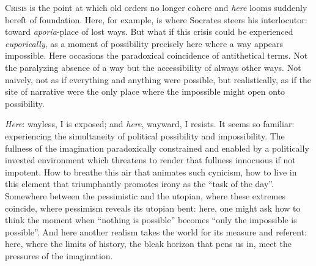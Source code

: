 \documentclass[
]{memoir}
\begin{document}
\textsc{Crisis} is the point at which old orders no longer cohere and
\emph{here} looms suddenly bereft of foundation. Here, for example, is
where Socrates steers his interlocutor: toward \emph{aporia}-place of
lost ways. But what if this crisis could be experienced
\emph{euporically}, as a moment of possibility precisely here where a
way appears impossible. Here occasions the paradoxical coincidence of
antithetical terms. Not the paralyzing absence of a way but the
accessibility of always other ways. Not naively, not as if everything
and anything were possible, but realistically, as if the site of
narrative were the only place where the impossible might open onto
possibility.

\emph{Here}: wayless, I is exposed; and \emph{here}, wayward, I resists.
It seems so familiar: experiencing the simultaneity of political
possibility and impossibility. The fullness of the imagination
paradoxically constrained and enabled by a politically invested
environment which threatens to render that fullness innocuous if not
impotent. How to breathe this air that animates such cynicism, how to
live in this element that triumphantly promotes irony as the ``task of
the day''. Somewhere between the pessimistic and the utopian, where
these extremes coincide, where pessimism reveals its utopian bent: here,
one might ask how to think the moment when ``nothing is possible''
becomes ``only the impossible is possible''. And here another realism
takes the world for its measure and referent: here, where the limits of
history, the bleak horizon that pens us in, meet the pressures of the
imagination.
\end{document}
